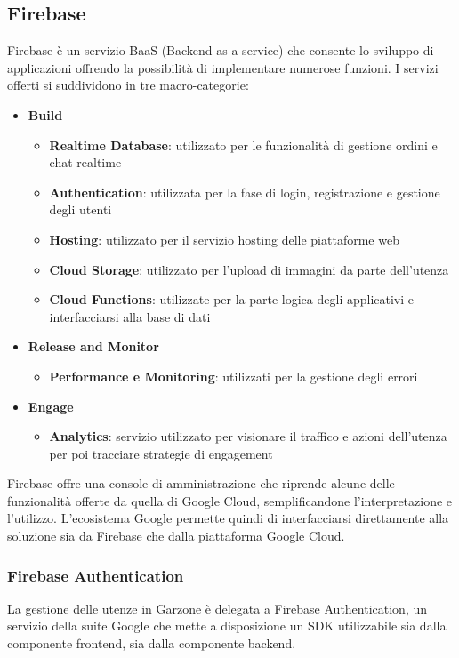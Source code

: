 \subsection{Firebase}
Firebase è un servizio BaaS (Backend-as-a-service) che consente lo sviluppo di applicazioni offrendo la possibilità di implementare numerose funzioni. I servizi offerti si suddividono in tre macro-categorie\cite{FIRE}:
\begin{itemize}
    \item \textbf{Build}
    \begin{itemize}
        \item \textbf{Realtime Database}: utilizzato per le funzionalità di gestione ordini e chat realtime
        \item \textbf{Authentication}: utilizzata per la fase di login, registrazione e gestione degli utenti
        \item \textbf{Hosting}: utilizzato per il servizio hosting delle piattaforme web
        \item \textbf{Cloud Storage}: utilizzato per l'upload di immagini da parte dell'utenza
        \item \textbf{Cloud Functions}: utilizzate per la parte logica degli applicativi e interfacciarsi alla base di dati
    \end{itemize}
    \item \textbf{Release and Monitor}
    \begin{itemize}
        \item \textbf{Performance e Monitoring}: utilizzati per la gestione degli errori
    \end{itemize}
    \item \textbf{Engage}
    \begin{itemize}
        \item \textbf{Analytics}: servizio utilizzato per visionare il traffico e azioni dell'utenza per poi tracciare strategie di engagement
    \end{itemize}
\end{itemize} 
Firebase offre una console di amministrazione che riprende alcune delle funzionalità offerte da quella di Google Cloud, semplificandone l'interpretazione e l'utilizzo. L'ecosistema Google permette quindi di interfacciarsi direttamente alla soluzione sia da Firebase che dalla piattaforma Google Cloud.
\subsubsection{Firebase Authentication}
La gestione delle utenze in Garzone è delegata a Firebase Authentication, un servizio della suite Google che mette a disposizione un SDK utilizzabile sia dalla componente frontend, sia dalla componente backend. 

